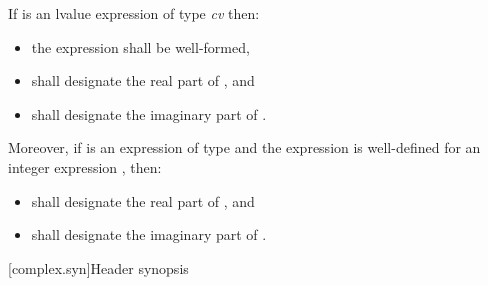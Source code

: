 \pnum
If  is an lvalue expression of type \emph{cv}  then:

\begin{itemize}
\item the expression  shall be well-formed,
\item {} shall designate the real part of , and
\item {} shall designate the imaginary part of .
\end{itemize}

Moreover, if  is an expression of type  and the expression  is well-defined for an integer expression , then:

\begin{itemize}
\item {} shall designate the real part of , and
\item {} shall designate the imaginary part of .
\end{itemize}

[complex.syn]{Header  synopsis}

